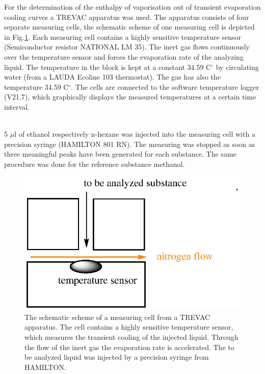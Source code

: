 \documentclass[a4paper,abstracton]{article}	                       %
\begin{document}
For the determination of the enthalpy of vaporisation out of transient evaporation cooling curves a TREVAC apparatus was used. The apparatus consists of four separate measuring cells, the schematic scheme of one measuring cell is depicted in Fig.\ref{fig:Skizze2}. Each measuring cell contains a highly sensitive temperature sensor (Semiconductor resistor NATIONAL LM 35). The inert  gas flows continuously over the temperature sensor and forces the evaporation rate of the analyzing liquid. The temperature in the block is kept at a constant 34.59 C$^{\circ}$ by circulating water (from a LAUDA Ecoline 103 thermostat). The  gas has also the temperature  34.59 C$^{\circ}$. The cells are connected to the software temperature logger (V21.7), which graphically displays the measured temperatures at a certain time interval. 

\\

5 $\mu$l of ethanol respectively n-hexane was injected into the measuring cell with a precision syringe (HAMILTON 801 RN). The measuring was stopped as soon as three meaningful peaks have been generated for each substance. The same procedure was done for the reference substance methanol. 

\begin{figure}[H]
\begin{minipage}[c]{0.55\textwidth}
\centering
 \includegraphics[scale=0.9] {skizze2DDR.eps}
 \end{minipage}\hfill
\begin{minipage}[c]{0.4\textwidth}
\caption{\label{fig:Skizze2} The schematic scheme of a measuring cell from a TREVAC apparatus. The cell contains a highly sensitive temperature sensor, which measures the transient cooling of the injected liquid. Through the flow of the inert gas the evaporation rate is accelerated. The to be analyzed liquid was injected by a precision syringe from HAMILTON.} 
\end{minipage}
\end{figure}
\end{document}
